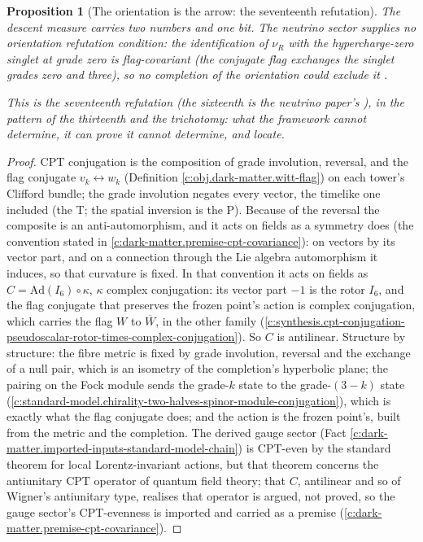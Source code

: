 \documentclass[11pt]{article}
\newtheorem{proposition}[theorem]{Proposition}
\theoremstyle{definition}
\theoremstyle{plain}
\begin{document}
\begin{proposition}[The orientation is the arrow: the seventeenth refutation]
The descent measure carries two numbers and one bit. The neutrino sector supplies no orientation refutation condition: the identification of $\nu_{R}$ with the hypercharge-zero singlet at grade zero is flag-covariant (the conjugate flag exchanges the singlet grades zero and three), so no completion of the orientation could exclude it \cite{ButlerT15}.

This is the seventeenth refutation (the sixteenth is the neutrino paper's \cite[Prop.~4.1(1)]{ButlerT15}), in the pattern of the thirteenth and the trichotomy: what the framework cannot determine, it can prove it cannot determine, and locate.
\end{proposition}
\begin{proof}
CPT conjugation is the composition of grade involution, reversal, and the flag conjugate $v_{k} \leftrightarrow w_{k}$ (Definition \ref{c:obj.dark-matter.witt-flag}) on each tower's Clifford bundle; the grade involution negates every vector, the timelike one included (the T; the spatial inversion is the P). Because of the reversal the composite is an anti-automorphism, and it acts on fields as a symmetry does (the convention stated in \ref{c:dark-matter.premise-cpt-covariance}): on vectors by its vector part, and on a connection through the Lie algebra automorphism it induces, so that curvature is fixed. In that convention it acts on fields as $C = \mathrm{Ad}(I_{6}) \circ \kappa$, $\kappa$ complex conjugation: its vector part $-1$ is the rotor $I_{6}$, and the flag conjugate that preserves the frozen point's action is complex conjugation, which carries the flag $W$ to $\overline W$, in the other family (\ref{c:synthesis.cpt-conjugation-pseudoscalar-rotor-times-complex-conjugation}). So $C$ is antilinear. Structure by structure: the fibre metric is fixed by grade involution, reversal and the exchange of a null pair, which is an isometry of the completion's hyperbolic plane; the pairing on the Fock module sends the grade-$k$ state to the grade-$(3-k)$ state \cite[Prop.~5.6]{ButlerT12} (\ref{c:standard-model.chirality-two-halves-spinor-module-conjugation}), which is exactly what the flag conjugate does; and the action is the frozen point's, built from the metric and the completion. The derived gauge sector (Fact \ref{c:dark-matter.imported-inputs-standard-model-chain}) is CPT-even by the standard theorem for local Lorentz-invariant actions, but that theorem concerns the antiunitary CPT operator of quantum field theory; that $C$, antilinear and so of Wigner's antiunitary type, realises that operator is argued, not proved, so the gauge sector's CPT-evenness is imported and carried as a premise (\ref{c:dark-matter.premise-cpt-covariance}).


\end{proof}
\end{document}
